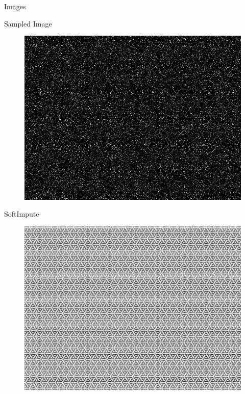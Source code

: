 \documentclass{beamer}
\begin{document}
\begin{frame}{Images}
	\vspace{-0.2cm}
	\begin{multicols}{2}
		\hspace{0.7cm}Sampled Image
		\vspace{-0.2cm}
		\begin{figure}[h]
			\centering
			\includegraphics[width=0.8\linewidth]{./../data/images/presentation/p1_2_01_20.jpg}
		\end{figure}
		\hspace{0.7cm}SoftImpute
		\vspace{-0.2cm}
		\begin{figure}[h]
			\centering
			\includegraphics[width=0.8\linewidth]{./../data/images/presentation/p1_5_20_01_SI_RMSE_006935.jpg}
		\end{figure}
	\end{multicols}
	

\end{frame}
\end{document}
